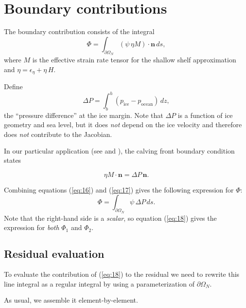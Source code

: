 \documentclass{amsart}
\newcommand{\N}{\mathbf{n}}
\newcommand{\boundary}{\partial \Omega_N}
\newcommand{\bI}{\ensuremath{\int_{\boundary}}}
\newcommand{\etaM}{\ensuremath{\eta M}}
\begin{document}
\section{Boundary contributions}
\label{sec:boundary}

The boundary contribution consists of the integral
\begin{equation}
  \label{eq:15}
  \Phi = \bI (\psi\, \etaM) \cdot \N\, ds,
\end{equation}
where $M$ is the effective strain rate tensor for the shallow shelf
approximation and $\eta = \epsilon_{\eta} + \eta\, H$.

Define
\newcommand{\dP}{\Delta P}
\begin{equation}
  \label{eq:17}
  \dP = \int_{b}^{h} (p_{\mathrm{ice}} - p_{\mathrm{ocean}})\,dz,
\end{equation}
the ``pressure difference'' at the ice margin. Note that $\dP$ is a function of ice geometry and sea level, but it does \emph{not} depend on the ice velocity and therefore does \emph{not} contribute to the Jacobian.

In our particular application (see \cite{GreveBlatter2009} and \cite{KhroulevBueler2013}), the calving front boundary condition states

\begin{equation}
  \label{eq:16}
  \etaM \cdot \N = \dP\, \N.
\end{equation}

Combining equations (\ref{eq:16}) and (\ref{eq:17}) gives the following expression for $\Phi$:
\begin{equation}
  \label{eq:18}
  \Phi = \bI \psi\, \dP\,ds.
\end{equation}
Note that the right-hand side is a \emph{scalar}, so equation (\ref{eq:18}) gives the expression for \emph{both} $\Phi_{1}$ and $\Phi_{2}$.

\subsection{Residual evaluation}
\label{sec:boundary-residual}

To evaluate the contribution of (\ref{eq:18}) to the residual we need to rewrite this line integral as a regular integral by using a parameterization of $\boundary$.

As usual, we assemble it element-by-element.



\end{document}
